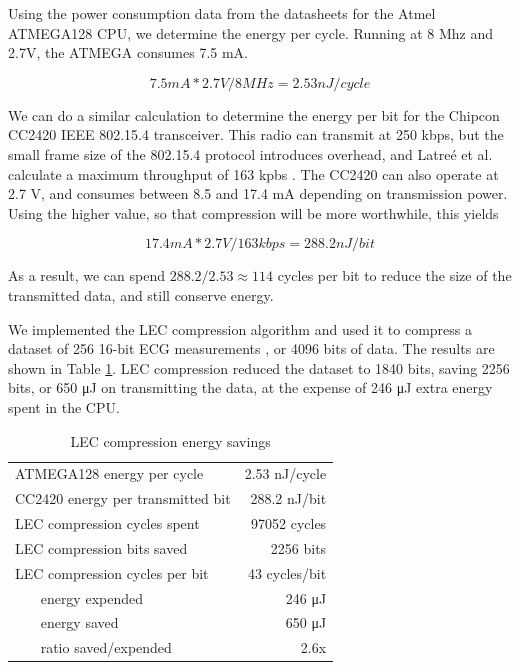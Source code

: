 Using the power consumption data from the datasheets for the Atmel ATMEGA128 \cite{Atmel:ATMEGA128Datasheet} CPU, we determine the energy per cycle. Running at 8 Mhz and 2.7V, the ATMEGA consumes 7.5 mA.

\begin{equation}
    7.5mA * 2.7V / 8MHz = 2.53nJ / cycle  
\end{equation}

We can do a similar calculation to determine the energy per bit for the Chipcon CC2420 IEEE 802.15.4 transceiver. This radio can transmit at 250 kbps, but the small frame size of the 802.15.4 protocol introduces overhead, and Latre\'e et al. calculate a maximum throughput of 163 kpbs \cite{Latre:2006wr}. The CC2420 can also operate at 2.7 V, and consumes between 8.5 and 17.4 mA depending on transmission power. Using the higher value, so that compression will be more worthwhile, this yields

\begin{equation}
  17.4 mA * 2.7 V / 163 kbps = 288.2 nJ / bit
\end{equation}

As a result, we can spend $288.2/2.53 \approx 114$ cycles per bit to reduce the size of the transmitted data, and still conserve energy.

We implemented the LEC compression algorithm and used it to compress a dataset of 256 16-bit ECG measurements \cite{physionet-ecg-data}, or 4096 bits of data. The results are shown in Table \ref{tbl-lec-energy}. LEC compression reduced the dataset to 1840 bits, saving 2256 bits, or 650 μJ on transmitting the data, at the expense of 246 μJ extra energy spent in the CPU.

\begin{table}
\caption{LEC compression energy savings}
\label{tbl-lec-energy}
    \begin{tabular}{lr}
    \toprule
    ATMEGA128 energy per cycle            & 2.53 nJ/cycle  \\
    CC2420 energy per transmitted bit     & 288.2 nJ/bit  \\
    \midrule
    LEC compression cycles spent          & 97052 cycles\\
    LEC compression bits saved            & 2256 bits \\
    LEC compression cycles per bit        & 43 cycles/bit \\
    ~~~ energy expended                   & 246 μJ \\
    ~~~ energy saved                      & 650 μJ \\
    ~~~ ratio saved/expended              & 2.6x \\
    \bottomrule
    \end{tabular}
\end{table}

